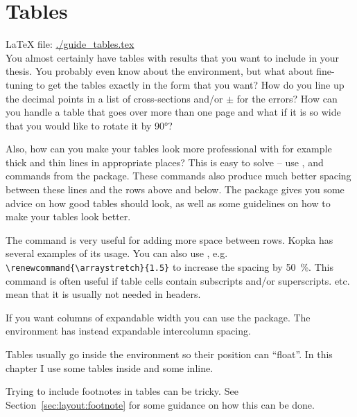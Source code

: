 \chapter{Tables}
\label{sec:table}

\LaTeX{} file: \url{./guide_tables.tex}\\[1ex]
\noindent
You almost certainly have tables with results that you want to include
in your thesis. You probably even know about the 
environment, but what about fine-tuning to get the tables exactly in
the form that you want? How do you line up the decimal points in a
list of cross-sections and/or $\pm$ for the errors? How can you
handle a table that goes over more than one page and what if it is so
wide that you would like to rotate it by \ang{90}?

Also, how can you make your tables look more professional with for
example thick and thin lines in appropriate places? This is easy to
solve -- use ,  and 
commands from the  package. These commands also
produce much better spacing between these lines and the rows above and
below. The  package gives you some advice on how
good tables should look, as well as some guidelines on how to make your
tables look better.

The  command is very useful for adding more space between
rows. Kopka has several examples of its usage. You can also use
, e.g. \verb+\renewcommand{\arraystretch}{1.5}+ to
increase the spacing by \SI{50}{\percent}. This command is often useful if table
cells contain subscripts and/or superscripts. 
etc. mean that it is usually not needed in headers.

If you want columns of expandable width you can use the
 package. The environment  has instead
expandable intercolumn spacing.

Tables usually go inside the  environment so their position
can \enquote{float}. In this chapter I use some tables inside 
and some inline.

Trying to include footnotes in tables can be tricky. See
Section~\ref{sec:layout:footnote} for some guidance on how this can be done.


